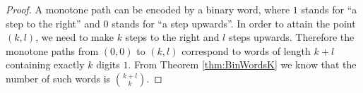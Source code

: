 

\setcounter{section}{3}
\setcounter{subsection}{3}
\setcounter{dfn}{4}

\begin{proof}
A monotone path can be encoded by a binary word,
where $1$ stands for ``a step to the right'' and $0$ stands for ``a step upwards''.
In order to attain the point $(k,l)$, we need to make $k$ steps to the right and $l$ steps upwards.
Therefore the monotone paths from $(0,0)$ to $(k,l)$ correspond to words of length $k+l$
containing exactly $k$ digits $1$.
From Theorem \ref{thm:BinWordsK} we know that the number of such words is $\binom{k+l}{k}$.
\end{proof}



